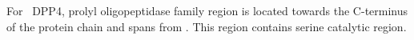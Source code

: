 For~ DPP4, prolyl oligopeptidase family region is located towards the C-terminus of the protein chain and spans from . This region contains serine catalytic region.  